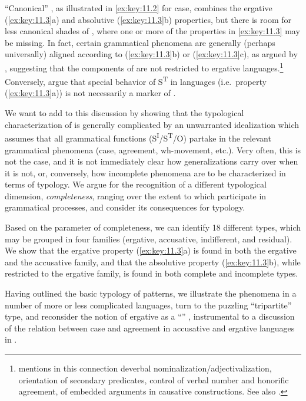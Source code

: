 \documentclass[output=paper]{langsci/langscibook}
\begin{document}
\enquote{Canonical} , as illustrated in \eqref{ex:key:11.2} for
 case, combines the ergative (\ref{ex:key:11.3}a) and absolutive (\ref{ex:key:11.3}b)
properties, but there is room for less canonical shades of , where
one or more of the properties in \eqref{ex:key:11.3} may be missing. In fact,
certain grammatical phenomena are generally (perhaps universally) aligned
according to (\ref{ex:key:11.3}b) or (\ref{ex:key:11.3}c), as argued by \textcite{Queixalos2013}, suggesting
that the components of  are not restricted to ergative
languages.\footnote{\textcite{Queixalos2013} mentions in this connection
    deverbal nominalization/adjectivalization, orientation of secondary
    predicates, control of verbal number and honorific agreement,  of
embedded arguments in causative constructions. See also
\citet{Moravcsik1978,Plank1979}.\label{fn:3}} Conversely,
\citet{VerbekeWillems2012} argue that special behavior of S\textsuperscript{T}
in  languages (i.e.\ property (\ref{ex:key:11.3}a)) is not
necessarily a marker of .

We want to add to this discussion by showing that the typological
characterization of  is generally complicated by an unwarranted
idealization which assumes that all grammatical functions
(S\textsuperscript{I}/S\textsuperscript{T}/O) partake in the relevant
grammatical phenomena (case, agreement, wh-movement, etc.). Very often, this is
not the case, and it is not immediately clear how  generalizations
carry over when it is not, or, conversely, how incomplete phenomena are to be
characterized in terms of  typology. We argue for the recognition of a
different typological dimension, \emph{completeness}, ranging over the extent
to which  participate in grammatical processes, and
consider its consequences for  typology.

Based on the parameter of completeness, we can identify 18 different
 types, which may be grouped in four families (ergative,
accusative, indifferent, and residual). We show that the ergative property
(\ref{ex:key:11.3}a) is found in both the ergative and the accusative family,
and that the absolutive property (\ref{ex:key:11.3}b), while restricted to the
ergative family, is found in both complete and incomplete types.

Having outlined the basic typology of  patterns, we illustrate the
phenomena in a number of more or less complicated languages, turn to the
puzzling \enquote{tripartite}  type, and reconsider the notion of
ergative as a \enquote{} \citep{Marantz1991}, instrumental
to a discussion of the relation between case and agreement in accusative and
ergative languages in \citet{Bobaljik2008}.
\end{document}
